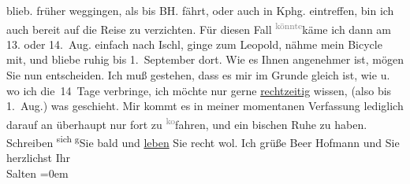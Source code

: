 \begin{ledgroupsized}[t]{13cm}
{{{                  blieb.}}}\label{K_L03159-6h} früher weggingen, als bis BH.
               fährt, oder auch \label{K_L03159-7v}\label{K_L03159-7h} in Kphg. eintreffen, bin ich auch
               bereit auf die Reise zu verzichten. Für diesen Fall \substVorne{}\textsuperscript{\textcolor{gray}{könnte}}{\allowbreak}\substDazwischen{}käme\substHinten{} ich dann am 13. oder 14. Aug. einfach nach Ischl, ginge zum
                  Leopold, nähme mein Bicycle mit, und bliebe
               ruhig bis 1. September dort. Wie es Ihnen angenehmer
               ist, mögen Sie nun entscheiden. Ich muß gestehen, dass es mir im Grunde gleich ist,
               wie u. wo ich die 14 Tage verbringe, ich möchte nur gerne \uline{rechtzeitig} wissen, (also bis 1. Aug.) was
               geschieht. Mir kommt es in meiner momentanen Verfassung lediglich darauf an überhaupt
               nur fort zu \substVorne{}\textsuperscript{\textcolor{gray}{ko}}\substDazwischen{}fa\substHinten{}hren, und ein bischen Ruhe zu haben.\pend
           \pstart
           Schreiben \substVorne{}\textsuperscript{sich g}{\allowbreak}\substDazwischen{}Sie b\substHinten{}ald und \uline{leben} Sie recht wol. Ich grüße Beer Hofmann und Sie {\\[\baselineskip]}herzlichst Ihr {\\[\baselineskip]}\spacefill\mbox{Salten}\pend
           \leftskip=0em{}
         
         \endnumbering{}\end{ledgroupsized}  \newcommand{\dateiname}{L03159}\newcommand{\titel}{Felix Salten an Arthur Schnitzler, 22. 7. 1895}\newcommand{\editorInnen}{Martin Anton Müller und Laura Untner}
      